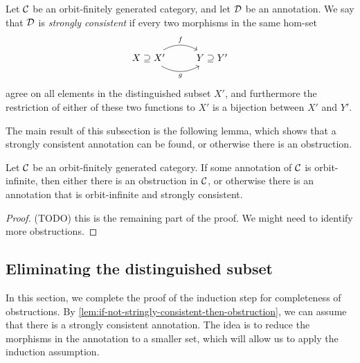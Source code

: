 \begin{definition}
    \label{def:strong-consistency}
    Let ${\mathcal C}$ be an orbit-finitely generated category, and let ${\mathcal D}$ be an annotation. We say that ${\mathcal D}$ is \emph{strongly consistent} if every two morphisms in the same hom-set 
    \[
    \begin{tikzcd}
    X \supseteq X' \ar[r, bend left, "f"]
    \ar[r, bend right, "g"'] & Y \supseteq Y'
    \end{tikzcd}
    \]
    agree on all elements in the distinguished subset $X'$, and furthermore the restriction of either of these two functions to $X'$ is a bijection between $X'$ and $Y'$. 
\end{definition}



The main result of this subsection is the following lemma, which shows that a strongly consistent annotation can be found, or otherwise there is an obstruction.

\begin{lemma}\label{lem:if-not-stringly-consistent-then-obstruction}
    Let ${\mathcal C}$ be an orbit-finitely generated category. If some annotation of ${\mathcal C}$ is orbit-infinite, then either there is an obstruction in ${\mathcal C}$, or otherwise there is an annotation that  is orbit-infinite and strongly consistent.  
\end{lemma}
\begin{proof}
    (TODO) this is the remaining part of the proof. We might need to identify more obstructions.
\end{proof}


\subsection{Eliminating the distinguished subset}
\label{sec:reductions}

In this section, we complete the proof of the induction step for completeness of obstructions. By \cref{lem:if-not-stringly-consistent-then-obstruction}, we can assume that there is a strongly consistent annotation. The idea is to reduce the morphisms in the annotation to a smaller set, which will allow us to apply the induction assumption.

